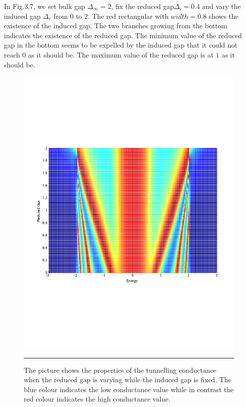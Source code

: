 In Fig.3.7, we set bulk gap $\Delta_{\infty}=2$, fix the reduced gap$\Delta_i=0.4$ and vary the induced gap $\Delta_r$ from $0$ to $2$.  The red rectangular with $width=0.8$ shows the existence of the induced gap. The two branches growing from the bottom indicates the existence of the reduced gap. The minimum value of the reduced gap in the bottom seems to be expelled by the induced gap that it could not reach $0$ as it should be. The maximum value of the reduced gap is at $1$ as it should be.
\begin{figure}[htbp]
\small
	\centering
		\includegraphics[width=12cm]{./Figures/3dreduceinduce.pdf}
		\rule{35em}{0.5pt}
	\caption[An Electron]{The picture shows the properties of the tunnelling conductance when the reduced gap is varying while the induced gap is fixed. The blue colour indicates the low conductance value while in contrast the red colour indicates the high conductance value.}
	\label{fig:Electron}
\end{figure}

